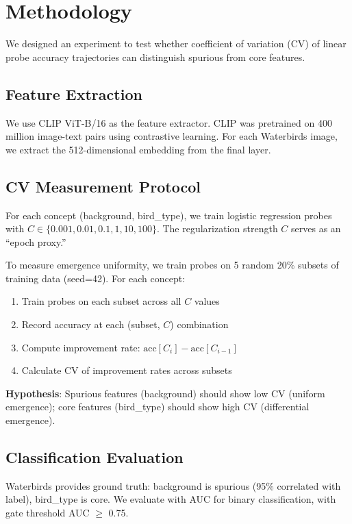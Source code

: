 \section{Methodology}

We designed an experiment to test whether coefficient of variation (CV) of linear probe accuracy trajectories can distinguish spurious from core features.

\subsection{Feature Extraction}

We use CLIP ViT-B/16 \citep{radford2021learning} as the feature extractor. CLIP was pretrained on 400 million image-text pairs using contrastive learning. For each Waterbirds image, we extract the 512-dimensional embedding from the final layer.

\subsection{CV Measurement Protocol}

For each concept (background, bird\_type), we train logistic regression probes with $C \in \{0.001, 0.01, 0.1, 1, 10, 100\}$. The regularization strength $C$ serves as an ``epoch proxy.''

To measure emergence uniformity, we train probes on 5 random 20\% subsets of training data (seed=42). For each concept:
\begin{enumerate}
    \item Train probes on each subset across all $C$ values
    \item Record accuracy at each (subset, $C$) combination
    \item Compute improvement rate: $\text{acc}[C_i] - \text{acc}[C_{i-1}]$
    \item Calculate CV of improvement rates across subsets
\end{enumerate}

\textbf{Hypothesis}: Spurious features (background) should show low CV (uniform emergence); core features (bird\_type) should show high CV (differential emergence).

\subsection{Classification Evaluation}

Waterbirds provides ground truth: background is spurious (95\% correlated with label), bird\_type is core. We evaluate with AUC for binary classification, with gate threshold AUC $\geq$ 0.75.

